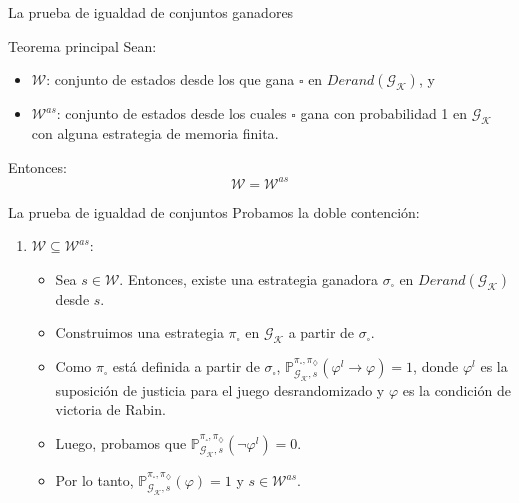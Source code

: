 \documentclass{beamer}
\newcommand{\St}{\mathcal{S}}
\newcommand{\Act}{\mathcal{A}}
\newcommand{\diam}{\diamondsuit}
\newcommand{\cuad}{\square}
\newcommand{\Gk}{\mathcal{G}_\mathcal{K}}
\newcounter{saveenumi}
\newcommand{\seti}{\setcounter{saveenumi}{\value{enumi}}}
\newcommand{\Prob}{\mathbb{P}}
\newcommand{\W}{\mathcal{W}}
\newcommand{\DGk}{Derand(\Gk)}
\newcommand{\picuad}{\pi_{\square}}
\newcommand{\pidiam}{\pi_{\diamondsuit}}
\newcommand{\ProbG}{\Prob_{\Gk, s}^{\picuad, \pidiam}}
\begin{document}
\begin{frame}{La prueba de igualdad de conjuntos ganadores}

	\begin{block}{Teorema principal}
		Sean:
		\begin{itemize}
			\item $\W$: conjunto de estados desde los que gana $\cuad$ en $\DGk$, y
			      \pause
			\item $\W^{as}$: conjunto de estados desde los cuales $\cuad$ gana con probabilidad 1 en $\Gk$ \tiny{con alguna estrategia de memoria finita}. \normalsize
			      \pause
		\end{itemize}

		Entonces: $$\W =\W^{as}$$ \vspace{0.1cm}
	\end{block}


\end{frame}

\begin{frame}{La prueba de igualdad de conjuntos}
	Probamos la doble contenci\'on:
	\begin{enumerate}
		\item $\W \subseteq \W^{as}$:

		      \pause
		      \begin{itemize}
			      \item Sea $s \in \W$. Entonces, existe una estrategia ganadora $\sigma_\cuad$ en
			            $\DGk$ desde $s$. \pause
			      \item Construimos una estrategia $\pi_\cuad$ en $\Gk$ a partir de $\sigma_\cuad$.
			            \pause
			      \item Como $\pi_\cuad$ está definida a partir de $\sigma_\cuad$, $\ProbG(\varphi^l
				            \rightarrow \varphi) = 1$, donde $\varphi^l$ es la suposici\'on de justicia
			            para el juego desrandomizado y $\varphi$ es la condici\'on de victoria de
			            Rabin. \pause
			      \item Luego, probamos que $\ProbG(\neg \varphi^l) = 0$. \pause
			      \item Por lo tanto, $\ProbG(\varphi) = 1$ y $s \in \W^{as}$.
		      \end{itemize}
		      \seti
	\end{enumerate}
\end{frame}
\end{document}
